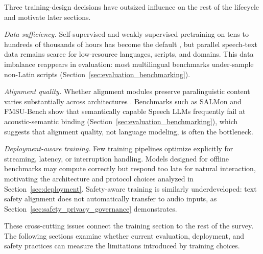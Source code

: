 Three training-design decisions have outsized influence on the rest of
the lifecycle and motivate later sections.

\emph{Data sufficiency.} Self-supervised and weakly supervised
pretraining on tens to hundreds of thousands of hours has become the
default \citep{radford2023robust,bai2024seed}, but parallel speech-text
data remains scarce for low-resource languages, scripts, and domains.
This data imbalance reappears in evaluation: most multilingual
benchmarks under-sample non-Latin scripts (Section~\ref{sec:evaluation_benchmarking}).

\emph{Alignment quality.} Whether alignment modules preserve
paralinguistic content varies substantially across architectures
\citep{mousavi2025alas,fan2025alignformer}. Benchmarks such as SALMon and
FMSU-Bench show that semantically capable Speech LLMs frequently fail at
acoustic-semantic binding (Section~\ref{sec:evaluation_benchmarking}),
which suggests that alignment quality, not language modeling, is often
the bottleneck.

\emph{Deployment-aware training.} Few training pipelines optimize
explicitly for streaming, latency, or interruption handling. Models
designed for offline benchmarks may compute correctly but respond too
late for natural interaction, motivating the architecture and protocol
choices analyzed in Section~\ref{sec:deployment}. Safety-aware training
is similarly underdeveloped: text safety alignment does not
automatically transfer to audio inputs, as
Section~\ref{sec:safety_privacy_governance} demonstrates.

These cross-cutting issues connect the training section to the rest of the survey. The following sections examine whether current evaluation, deployment, and safety practices can measure the limitations introduced by training choices.
